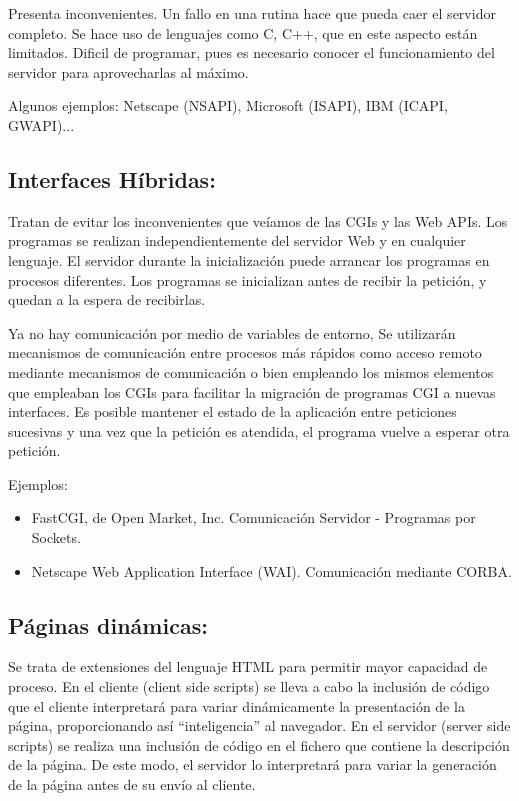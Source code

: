 \documentclass{apuntes}
\begin{document}
Presenta inconvenientes. Un fallo en una rutina hace que pueda caer el servidor completo. Se hace uso de lenguajes como C, C++, que en este aspecto están limitados. Dificil de programar, pues es necesario conocer el funcionamiento del servidor para aprovecharlas al máximo.

Algunos ejemplos: Netscape (NSAPI), Microsoft (ISAPI), IBM (ICAPI, GWAPI)...

\subsection{Interfaces Híbridas:}
Tratan de evitar los inconvenientes que veíamos de las CGIs y las Web APIs.
Los programas se realizan independientemente del servidor Web y en cualquier lenguaje.
El servidor durante la inicialización puede arrancar los programas en procesos diferentes.
Los programas se inicializan antes de recibir la petición, y quedan a la espera de recibirlas.

Ya no hay comunicación por medio de variables de entorno, Se utilizarán mecanismos de comunicación entre procesos más rápidos como acceso remoto mediante mecanismos de comunicación o bien empleando los mismos elementos que empleaban los CGIs para facilitar la migración de programas CGI a nuevas interfaces.
Es posible mantener el estado de la aplicación entre peticiones sucesivas y una vez que la petición es atendida, el programa vuelve a esperar otra petición.

\newpage
Ejemplos:
\begin{itemize}
\item FastCGI, de Open Market, Inc. Comunicación Servidor - Programas por Sockets.
\item Netscape Web Application Interface (WAI). Comunicación mediante CORBA.
\end{itemize}

\subsection{Páginas dinámicas:}
Se trata de extensiones del lenguaje HTML para permitir mayor capacidad de proceso. En el cliente (client side scripts) se lleva a cabo la inclusión de código que el cliente interpretará para variar dinámicamente la presentación de la página, proporcionando así “inteligencia” al navegador. En el servidor (server side scripts) se realiza una inclusión de código en el fichero que contiene la descripción de la página. De este modo, el servidor lo interpretará para variar la generación de la página antes de su envío al cliente.
\end{document}
